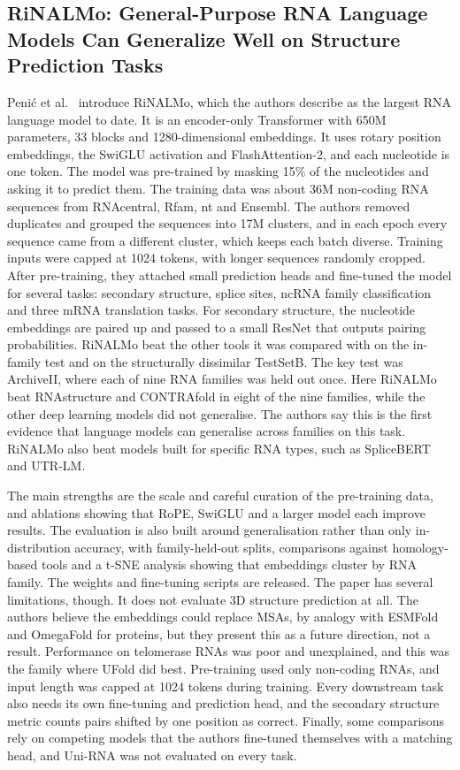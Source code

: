 \documentclass{FastFyp}
\begin{document}
\subsection{RiNALMo: General-Purpose RNA Language Models Can Generalize Well on Structure Prediction Tasks}
Peni\'c et al.~\cite{ref:Penic:2024} introduce RiNALMo, which the authors describe as the largest RNA language model to date. It is an encoder-only Transformer with 650M parameters, 33 blocks and 1280-dimensional embeddings. It uses rotary position embeddings, the SwiGLU activation and FlashAttention-2, and each nucleotide is one token. The model was pre-trained by masking 15\% of the nucleotides and asking it to predict them. The training data was about 36M non-coding RNA sequences from RNAcentral, Rfam, nt and Ensembl. The authors removed duplicates and grouped the sequences into 17M clusters, and in each epoch every sequence came from a different cluster, which keeps each batch diverse. Training inputs were capped at 1024 tokens, with longer sequences randomly cropped. After pre-training, they attached small prediction heads and fine-tuned the model for several tasks: secondary structure, splice sites, ncRNA family classification and three mRNA translation tasks. For secondary structure, the nucleotide embeddings are paired up and passed to a small ResNet that outputs pairing probabilities. RiNALMo beat the other tools it was compared with on the in-family test and on the structurally dissimilar TestSetB. The key test was ArchiveII, where each of nine RNA families was held out once. Here RiNALMo beat RNAstructure and CONTRAfold in eight of the nine families, while the other deep learning models did not generalise. The authors say this is the first evidence that language models can generalise across families on this task. RiNALMo also beat models built for specific RNA types, such as SpliceBERT and UTR-LM.

The main strengths are the scale and careful curation of the pre-training data, and ablations showing that RoPE, SwiGLU and a larger model each improve results. The evaluation is also built around generalisation rather than only in-distribution accuracy, with family-held-out splits, comparisons against homology-based tools and a t-SNE analysis showing that embeddings cluster by RNA family. The weights and fine-tuning scripts are released. The paper has several limitations, though. It does not evaluate 3D structure prediction at all. The authors believe the embeddings could replace MSAs, by analogy with ESMFold and OmegaFold for proteins, but they present this as a future direction, not a result. Performance on telomerase RNAs was poor and unexplained, and this was the family where UFold did best. Pre-training used only non-coding RNAs, and input length was capped at 1024 tokens during training. Every downstream task also needs its own fine-tuning and prediction head, and the secondary structure metric counts pairs shifted by one position as correct. Finally, some comparisons rely on competing models that the authors fine-tuned themselves with a matching head, and Uni-RNA was not evaluated on every task.
\end{document}

